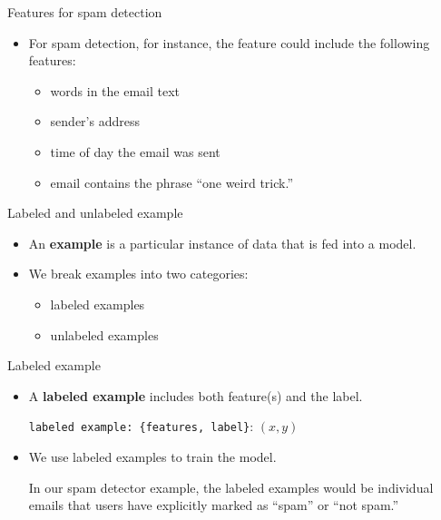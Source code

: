 \documentclass{beamer}
\begin{document}

\begin{frame}{Features for spam detection}

\begin{itemize}
\item For spam detection, for instance, the feature could include the following features:

\medskip
\begin{itemize}
\item words in the email text
\item sender's address
\item time of day the email was sent
\item email contains the phrase ``one weird trick.''
\end{itemize}
\end{itemize}

\end{frame}



\begin{frame}{Labeled and unlabeled example}

\begin{itemize}
\item An {\bf example} is a particular instance of data that is fed into a model. 

\medskip
\item We break examples into two categories:

\medskip
\begin{itemize}
\item
labeled examples

\medskip
\item
unlabeled examples
\end{itemize}
\end{itemize}

\end{frame}


\begin{frame}{Labeled example}

\begin{itemize}
\item A {\bf labeled example} includes both feature(s) and the label.

\medskip
\texttt{labeled example: \{features, label\}}: $(x, y)$

\medskip
\item We use labeled examples to train the model. 

\medskip
In our spam detector example, the labeled examples would be individual emails that users have explicitly marked as ``spam'' or ``not spam.''
\end{itemize}

\end{frame}
\end{document}
